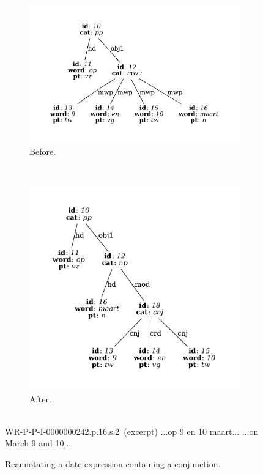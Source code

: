 \begin{figure}
	\centering
	\begin{subfigure}[b]{0.65\textwidth}
		\includegraphics[width=1\textwidth,trim={1.5cm 1.5cm 1.5cm 1.5cm}]{./prebuilt/date_before.pdf}
		\caption{Before.}
	\end{subfigure}\\[\midsep]
	\begin{subfigure}[b]{0.55\textwidth}
			\includegraphics[width=1\textwidth,trim={1.5cm 1.5cm 1.5cm 1.5cm}]{./prebuilt/date_after.pdf}
			\caption{After.}
	\end{subfigure}\\[\smallsep]
	\lassycap
		{WR-P-P-I-0000000242.p.16.s.2~\textnormal{(excerpt)}}
		{...op 9 en 10 maart...}
		{...on March 9 and 10...}
	\caption{Reannotating a date expression containing a conjunction.}
	\label{figure:mwu:datetime}
\end{figure}

